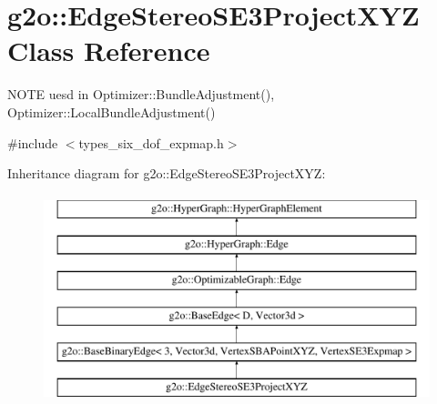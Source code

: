 \hypertarget{classg2o_1_1_edge_stereo_s_e3_project_x_y_z}{}\section{g2o\+:\+:Edge\+Stereo\+S\+E3\+Project\+X\+YZ Class Reference}
\label{classg2o_1_1_edge_stereo_s_e3_project_x_y_z}


N\+O\+TE uesd in Optimizer\+::\+Bundle\+Adjustment(), Optimizer\+::\+Local\+Bundle\+Adjustment()  




{\ttfamily \#include $<$types\+\_\+six\+\_\+dof\+\_\+expmap.\+h$>$}

Inheritance diagram for g2o\+:\+:Edge\+Stereo\+S\+E3\+Project\+X\+YZ\+:\begin{figure}[H]
\begin{center}
\leavevmode
\includegraphics[height=6.000000cm]{classg2o_1_1_edge_stereo_s_e3_project_x_y_z}
\end{center}
\end{figure}
